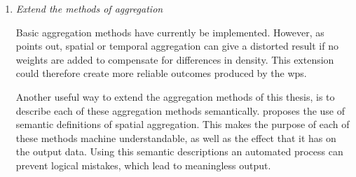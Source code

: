 \begin{enumerate}
	\item \textit{Extend the methods of aggregation}
	\label{par:FRaggregation}
	
	Basic aggregation methods have currently be implemented. However, as \cite{SW:Ganesan} points out, spatial or temporal aggregation can give a distorted result if no weights are added to compensate for differences in density. This extension could therefore create more reliable outcomes produced by the \ac{wps}. 
	
	Another useful way to extend the aggregation methods of this thesis, is to describe each of these aggregation methods semantically. \cite{SSW:Stasch4} proposes the use of semantic definitions of spatial aggregation. This makes the purpose of each of these methods machine understandable, as well as the effect that it has on the output data. Using this semantic descriptions an automated process can prevent logical mistakes, which lead to meaningless output.
\end{enumerate} 

